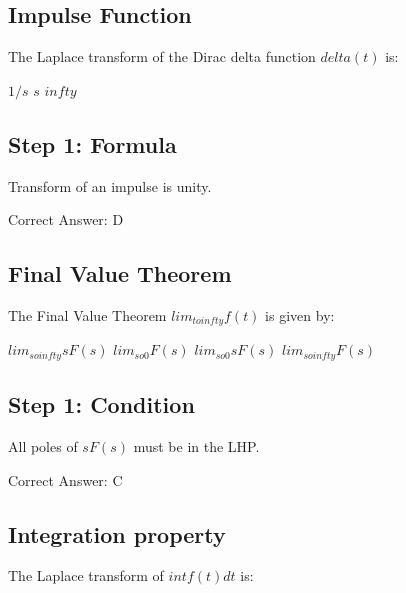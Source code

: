 \clearpage

\subsection{Impulse Function}

The Laplace transform of the Dirac delta function $delta(t)$ is:

\begin{choices}
    \choice $1/s$
    \choice $s$
    \choice $infty$
\end{choices}

\begin{solution}

\subsection*{Step 1: Formula}
Transform of an impulse is unity.

Correct Answer: D
\end{solution}

\clearpage

\subsection{Final Value Theorem}

The Final Value Theorem $lim_{t 	o infty} f(t)$ is given by:

\begin{choices}
    \choice $lim_{s 	o infty} sF(s)$
    \choice $lim_{s 	o 0} F(s)$
    \correctchoice $lim_{s 	o 0} sF(s)$
    \choice $lim_{s 	o infty} F(s)$
\end{choices}

\begin{solution}

\subsection*{Step 1: Condition}
All poles of $sF(s)$ must be in the LHP.

Correct Answer: C
\end{solution}

\clearpage

\subsection{Integration property}

The Laplace transform of $int f(t) dt$ is:

